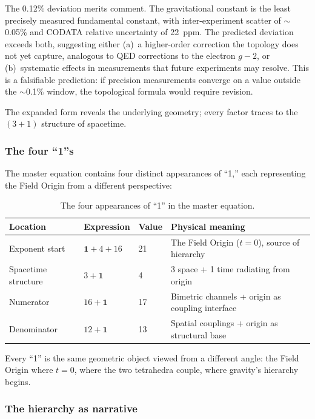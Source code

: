 \documentclass[aps,prd,preprint,superscriptaddress,showpacs,preprintnumbers,amsmath,amssymb,nofootinbib]{revtex4-2}
\begin{document}
The 0.12\% deviation merits comment. The gravitational constant is the least precisely measured fundamental constant, with inter-experiment scatter of $\sim$0.05\% and CODATA relative uncertainty of 22~ppm. The predicted deviation exceeds both, suggesting either (a)~a higher-order correction the topology does not yet capture, analogous to QED corrections to the electron $g-2$, or (b)~systematic effects in measurements that future experiments may resolve. This is a falsifiable prediction: if precision measurements converge on a value outside the $\sim$0.1\% window, the topological formula would require revision.

The expanded form reveals the underlying geometry; every factor traces to the $(3+1)$ structure of spacetime.

\subsubsection*{The four ``1''s}

The master equation contains four distinct appearances of ``1,'' each representing the Field Origin from a different perspective:

\begin{table}[H]
\centering
\begin{tabular*}{\textwidth}{@{\extracolsep{\fill}} llll @{}}
\toprule
\textbf{Location} & \textbf{Expression} & \textbf{Value} & \textbf{Physical meaning} \\
\midrule
Exponent start & $\mathbf{1} + 4 + 16$ & 21 & The Field Origin ($t = 0$), source of hierarchy \\
Spacetime structure & $3 + \mathbf{1}$ & 4 & 3 space + 1 time radiating from origin \\
Numerator & $16 + \mathbf{1}$ & 17 & Bimetric channels + origin as coupling interface \\
Denominator & $12 + \mathbf{1}$ & 13 & Spatial couplings + origin as structural base \\
\bottomrule
\end{tabular*}
\caption{The four appearances of ``1'' in the master equation.}
\label{tab:ones}
\end{table}

Every ``1'' is the same geometric object viewed from a different angle: the Field Origin where $t = 0$, where the two tetrahedra couple, where gravity's hierarchy begins.

\subsubsection*{The hierarchy as narrative}
\end{document}
